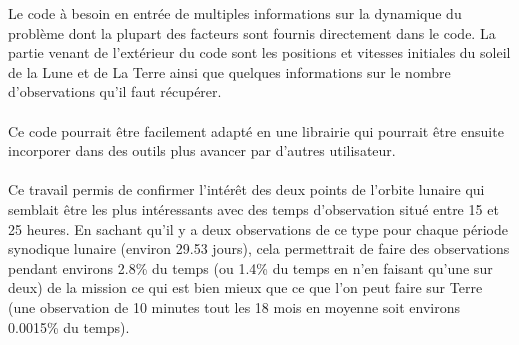 \documentclass[12pt]{article} %
\begin{document}
		Le code à besoin en entrée de multiples informations sur la dynamique du problème dont la plupart des facteurs sont fournis directement dans le code. La partie venant de l'extérieur du code sont les positions et vitesses initiales du soleil de la Lune et de La Terre ainsi que quelques informations sur le nombre d'observations qu'il faut récupérer.
		\\ \\
		Ce code pourrait être facilement adapté en une librairie qui pourrait être ensuite incorporer dans des outils plus avancer par d'autres utilisateur.
		\\ \\	
		Ce travail permis de confirmer l'intérêt des deux points de l'orbite lunaire qui semblait être les plus intéressants avec des temps d'observation situé entre 15 et 25 heures. En sachant qu'il y a deux observations de ce type pour chaque période synodique lunaire (environ 29.53 jours), cela permettrait de faire des observations pendant environs 2.8\% du temps (ou 1.4\% du temps en n'en faisant qu'une sur deux) de la mission ce qui est bien mieux que ce que l'on peut faire sur Terre (une observation de 10 minutes tout les 18 mois en moyenne soit environs 0.0015\% du temps).
		
\end{document}
